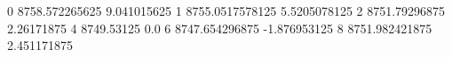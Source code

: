 0 8758.572265625 9.041015625
1 8755.0517578125 5.5205078125
2 8751.79296875 2.26171875
4 8749.53125 0.0
6 8747.654296875 -1.876953125
8 8751.982421875 2.451171875
